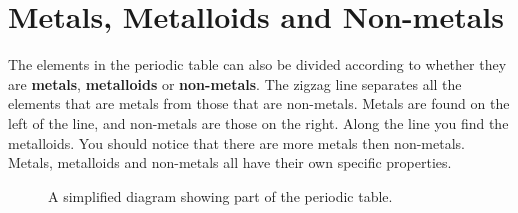             \section{Metals, Metalloids and Non-metals}
            \nopagebreak
      \label{m38708*id65693}The elements in the periodic table can also be divided according to whether they are \textbf{metals}, \textbf{metalloids} or \textbf{non-metals}. The zigzag line separates all the elements that are metals from those that are non-metals. Metals are found on the left of the line, and non-metals are those on the right. Along the line you find the metalloids. You should notice that there are more metals then non-metals. Metals, metalloids and non-metals all have their own specific properties.\par 
{} 
\begin{figure}[h]

\begin{center}
\end{center}
\caption{A simplified diagram showing part of the periodic table.}
\label{fig:periodic}
\end{figure} 
      \label{m38708*uid76}
